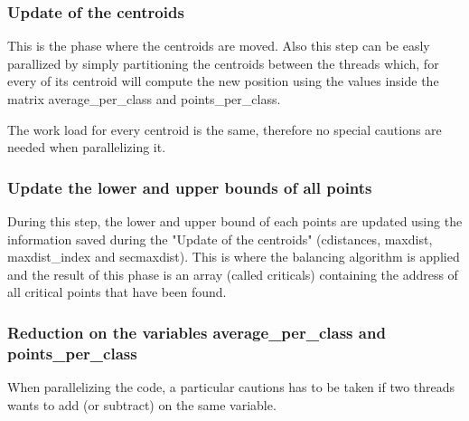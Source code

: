 \documentclass{report}
\begin{document}
\begin{minipage}[b]{0.48\textwidth}
  \subsubsection*{Update of the centroids}
  This is the phase where the centroids are moved. Also this step can be easly parallized by simply partitioning the centroids between the threads which, for every of its centroid will compute the new position using the values inside the matrix average\_per\_class and points\_per\_class.

  The work load for every centroid is the same, therefore no special cautions are needed when parallelizing it.

  \subsubsection*{Update the lower and upper bounds of all points}
  During this step, the lower and upper bound of each points are updated using the information saved during the "Update of the centroids" (cdistances, maxdist, maxdist\_index and secmaxdist). This is where the balancing algorithm is applied and the result of this phase is an array (called criticals) containing the address of all critical points that have been found. 

  \subsubsection*{Reduction on the variables average\_per\_class and points\_per\_class}
  When parallelizing the code, a particular cautions has to be taken if two threads wants to add (or subtract) on the same variable.
\end{minipage}
\hspace{0.1in}
\end{document}
